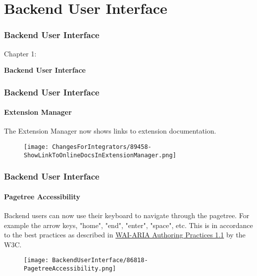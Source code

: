 %

\section{Backend User Interface}
\begin{frame}[fragile]
	\frametitle{Backend User Interface}

	\begin{center}\huge{Chapter 1:}\end{center}
	\begin{center}\huge{\color{typo3darkgrey}\textbf{Backend User Interface}}\end{center}

\end{frame}


\begin{frame}[fragile]
	\frametitle{Backend User Interface}
	\framesubtitle{Extension Manager}

	The Extension Manager now shows links to extension documentation.

	\begin{figure}
		\texttt{[image: ChangesForIntegrators/89458-ShowLinkToOnlineDocsInExtensionManager.png]}
	\end{figure}

\end{frame}


\begin{frame}[fragile]
	\frametitle{Backend User Interface}
	\framesubtitle{Pagetree Accessibility}

	Backend users can now use their keyboard to navigate through the pagetree.
	For example the arrow keys, "home", "end", "enter", "space", etc.
	\newline
	This is in accordance to the best practices as described in
	\href{https://www.w3.org/TR/wai-aria-practices-1.1/#keyboard-interaction-22}{WAI-ARIA Authoring Practices 1.1}
	by the W3C.

	\begin{figure}
		\texttt{[image: BackendUserInterface/86818-PagetreeAccessibility.png]}
	\end{figure}

\end{frame}

